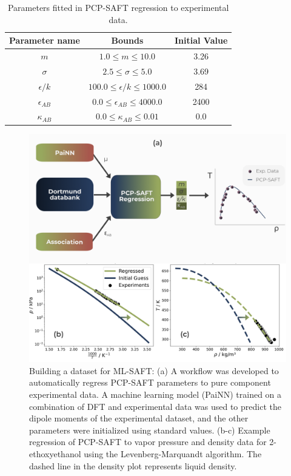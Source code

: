 \begin{table}
    \centering
    \caption{Parameters fitted in PCP-SAFT regression to experimental data.}
    \label{tab:regression_params}
    \begin{tabular}{ccc}
        Parameter name & Bounds & Initial Value \\
        \hline
        $m$ & $1.0 \leq m \leq 10.0$ & 3.26 \\
        $\sigma$ & $2.5 \leq \sigma \leq 5.0$ & 3.69 \\
        $\epsilon/k$ & $100.0 \leq \epsilon/k \leq 1000.0$ & 284 \\
        $\epsilon_{AB}$ & $0.0 \leq \epsilon_{AB} \leq 4000.0$ & 2400 \\
        $\kappa_{AB}$ & $0.0 \leq \kappa_{AB} \leq 0.01$ & 0.0 \\
    \end{tabular}
\end{table}


\begin{figure}
    \centering
    \includegraphics[width=\textwidth]{gfx/Chapter08/deepsaft_regression.png}
    \caption{Building a dataset for ML-SAFT: (a) A workflow was developed to automatically regress PCP-SAFT parameters to pure component experimental data. A machine learning model (PaiNN) trained on  a combination of DFT and experimental data was used to predict the dipole moments of the experimental dataset, and the other parameters were initialized using standard values. (b-c) Example regression of PCP-SAFT to vapor pressure and density data for 2-ethoxyethanol using the Levenberg-Marquandt algorithm. The dashed line in the density plot represents liquid density.}
    \label{fig:ML-SAFT_regression}
\end{figure}

